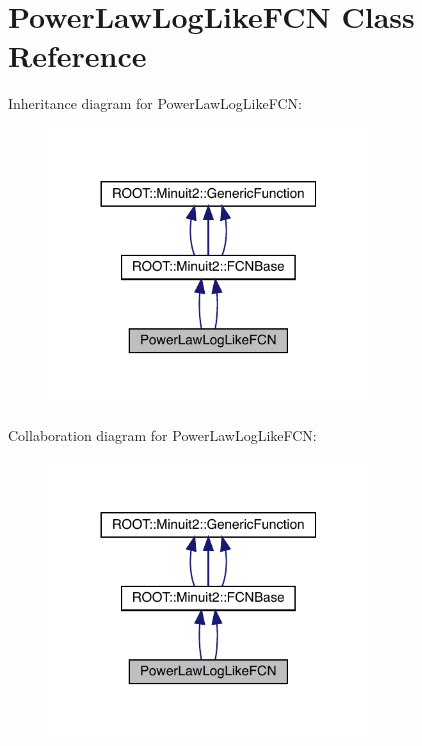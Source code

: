 \hypertarget{classPowerLawLogLikeFCN}{}\section{Power\+Law\+Log\+Like\+F\+CN Class Reference}
\label{classPowerLawLogLikeFCN}


Inheritance diagram for Power\+Law\+Log\+Like\+F\+CN\+:
\nopagebreak
\begin{figure}[H]
\begin{center}
\leavevmode
\includegraphics[width=240pt]{dc/ddc/classPowerLawLogLikeFCN__inherit__graph}
\end{center}
\end{figure}


Collaboration diagram for Power\+Law\+Log\+Like\+F\+CN\+:
\nopagebreak
\begin{figure}[H]
\begin{center}
\leavevmode
\includegraphics[width=240pt]{db/dba/classPowerLawLogLikeFCN__coll__graph}
\end{center}
\end{figure}
